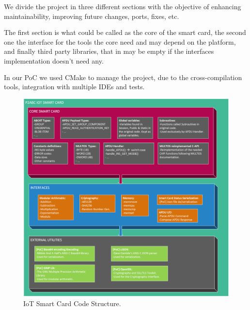 We divide the project in three different sections with the objective of enhancing maintainability, improving future changes, ports, fixes, etc.

The first section is what could be called as the core of the smart card, the second one the interface for the tools the core need and may depend on the platform, and finally third party libraries, that in may be empty if the interfaces implementation doesn't need any.


In our PoC we used CMake to manage the project, due to the cross-compilation tools, integration with multiple IDEs and tests.


\begin{figure}[bth]
	\begin{center}
		\includegraphics[width=\linewidth]{gfx/IoTCScomponents-color}
	\end{center}
	\caption{IoT Smart Card Code Structure.}
	\label{fig:IoTCScomponents-color}
\end{figure}

